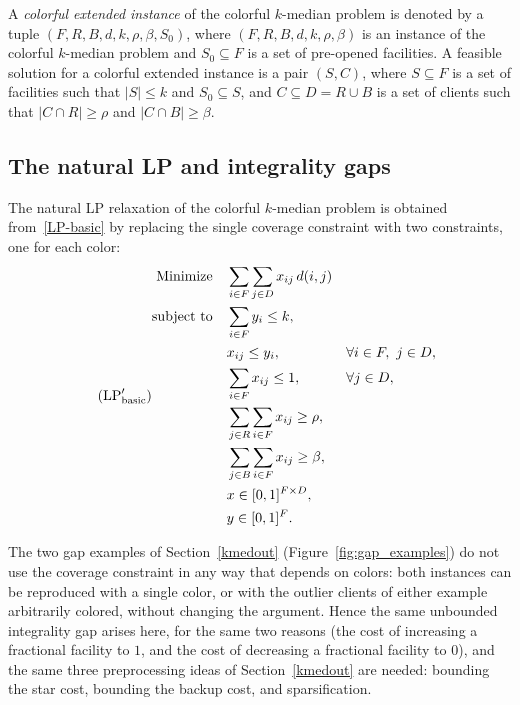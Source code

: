 \begin{definition}
A \emph{colorful extended instance} of the colorful $k$-median problem is denoted by a tuple $(F, R, B, d, k, \rho, \beta, S_0)$, where $(F,R,B,d,k,\rho,\beta)$ is an instance of the colorful $k$-median problem and $S_0 \subseteq F$ is a set of pre-opened facilities. A feasible solution for a colorful extended instance is a pair $(S,C)$, where $S \subseteq F$ is a set of facilities such that $|S| \leq k$ and $S_0 \subseteq S$, and $C \subseteq D = R \cup B$ is a set of clients such that $|C \cap R| \geq \rho$ and $|C \cap B| \geq \beta$.
\end{definition}

\subsection{The natural LP and integrality gaps}

The natural LP relaxation of the colorful $k$-median problem is obtained from~\eqref{LP-basic} by replacing the single coverage constraint with two constraints, one for each color:
\begin{equation}\tag{$\text{LP}_{\text{basic}}'$} \label{LP-basic-col}
\begin{aligned}
\text{Minimize} \quad &\sum_{i \in F} \sum_{j \in D} x_{ij} \,d(i,j) \\
\text{subject to} \quad &\sum_{i \in F} y_i \le k, \\
&x_{ij} \le y_i, && \forall i \in F, \ j \in D,\\
&\sum_{i \in F} x_{ij} \le 1, && \forall j \in D,\\
&\sum_{j \in R} \sum_{i \in F} x_{ij} \ge \rho, \\
&\sum_{j \in B} \sum_{i \in F} x_{ij} \ge \beta, \\
&x \in[0,1]^{F\times D}, \\
&y \in [0,1]^F.
\end{aligned}
\end{equation}

The two gap examples of Section~\ref{kmedout} (Figure~\ref{fig:gap_examples}) do not use the coverage constraint in any way that depends on colors: both instances can be reproduced with a single color, or with the outlier clients of either example arbitrarily colored, without changing the argument. Hence the same unbounded integrality gap arises here, for the same two reasons (the cost of increasing a fractional facility to $1$, and the cost of decreasing a fractional facility to $0$), and the same three preprocessing ideas of Section~\ref{kmedout} are needed: bounding the star cost, bounding the backup cost, and sparsification.

